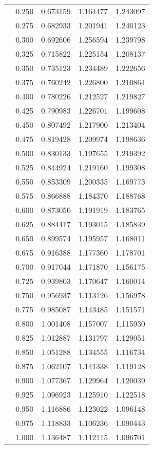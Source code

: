 \begin{tabular}{llrrr}
         & 0.250 &   0.673159 &   1.164477 &   1.243097 \\
         & 0.275 &   0.682933 &   1.201941 &   1.240123 \\
         & 0.300 &   0.692606 &   1.256594 &   1.239798 \\
         & 0.325 &   0.715822 &   1.225154 &   1.208137 \\
         & 0.350 &   0.735123 &   1.234489 &   1.222656 \\
         & 0.375 &   0.760242 &   1.226800 &   1.210864 \\
         & 0.400 &   0.780226 &   1.212527 &   1.219827 \\
         & 0.425 &   0.790983 &   1.226701 &   1.199608 \\
         & 0.450 &   0.807492 &   1.217900 &   1.213404 \\
         & 0.475 &   0.819428 &   1.209974 &   1.198636 \\
         & 0.500 &   0.830133 &   1.197655 &   1.219392 \\
         & 0.525 &   0.844924 &   1.219160 &   1.199308 \\
         & 0.550 &   0.853309 &   1.200335 &   1.169773 \\
         & 0.575 &   0.866888 &   1.184370 &   1.188768 \\
         & 0.600 &   0.873050 &   1.191919 &   1.183765 \\
         & 0.625 &   0.884417 &   1.193015 &   1.185839 \\
         & 0.650 &   0.899574 &   1.195957 &   1.168011 \\
         & 0.675 &   0.916388 &   1.177360 &   1.178701 \\
         & 0.700 &   0.917044 &   1.171870 &   1.156175 \\
         & 0.725 &   0.939803 &   1.170647 &   1.160014 \\
         & 0.750 &   0.956937 &   1.113126 &   1.156978 \\
         & 0.775 &   0.985087 &   1.143485 &   1.151571 \\
         & 0.800 &   1.001408 &   1.157007 &   1.115930 \\
         & 0.825 &   1.012887 &   1.131797 &   1.129051 \\
         & 0.850 &   1.051288 &   1.134555 &   1.116734 \\
         & 0.875 &   1.062107 &   1.141338 &   1.119128 \\
         & 0.900 &   1.077367 &   1.129964 &   1.120039 \\
         & 0.925 &   1.096923 &   1.125910 &   1.122518 \\
         & 0.950 &   1.116886 &   1.123022 &   1.096148 \\
         & 0.975 &   1.118833 &   1.106236 &   1.090443 \\
         & 1.000 &   1.136487 &   1.112115 &   1.096701 \\
\bottomrule
\end{tabular}
